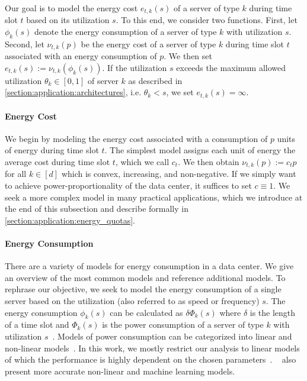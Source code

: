Our goal is to model the energy cost $e_{t,k}(s)$ of a server of type $k$ during time slot $t$ based on its utilization $s$. To this end, we consider two functions. First, let $\phi_k(s)$ denote the energy consumption of a server of type $k$ with utilization $s$. Second, let $\nu_{t,k}(p)$ be the energy cost of a server of type $k$ during time slot $t$ associated with an energy consumption of $p$. We then set $e_{t,k}(s) := \nu_{t,k}(\phi_k(s))$. If the utilization $s$ exceeds the maximum allowed utilization $\theta_k \in [0,1]$ of server $k$ as described in \cref{section:application:architectures}, i.e. $\theta_k < s$, we set $e_{t,k}(s) = \infty$.

\paragraph{Energy Cost} We begin by modeling the energy cost associated with a consumption of $p$ units of energy during time slot $t$. The simplest model assigns each unit of energy the average cost during time slot $t$, which we call $c_t$. We then obtain $\nu_{t,k}(p) := c_t p$ for all $k \in [d]$ which is convex, increasing, and non-negative. If we simply want to achieve power-proportionality of the data center, it suffices to set $c \equiv 1$. We seek a more complex model in many practical applications, which we introduce at the end of this subsection and describe formally in \cref{section:application:energy_quotas}.

\paragraph{Energy Consumption} There are a variety of models for energy consumption in a data center. We give an overview of the most common models and reference additional models. To rephrase our objective, we seek to model the energy consumption of a single server based on the utilization (also referred to as speed or frequency) $s$. The energy consumption $\phi_k(s)$ can be calculated as $\delta \Phi_k(s)$ where $\delta$ is the length of a time slot and $\Phi_k(s)$ is the power consumption of a server of type $k$ with utilization $s$~\cite{Dayarathna2016}. Models of power consumption can be categorized into linear and non-linear models~\cite{Ismail2020}. In this work, we mostly restrict our analysis to linear models of which the performance is highly dependent on the chosen parameters~\cite{Ismail2020}. \citeauthor*{Ismail2020}~\cite{Ismail2020} also present more accurate non-linear and machine learning models.

